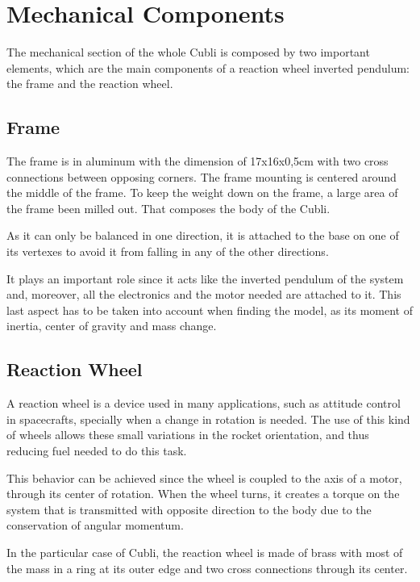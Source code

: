 \section{Mechanical Components}
The mechanical section of the whole Cubli is composed by two important elements, which are the main components of a reaction wheel inverted pendulum: the frame and the reaction wheel.



\subsection{Frame}



The frame is in aluminum with the dimension of 17x16x0,5cm  with two cross connections between opposing corners. The frame mounting is centered around the middle of the frame.
To keep the weight down on the frame, a large area of the frame been milled out. That composes the body of the Cubli. 

As it can only be balanced in one direction, it is attached to the base on one of its vertexes to avoid it from falling in any of the other directions.

It plays an important role since it acts like the inverted pendulum of the system and, moreover, all the electronics and the motor needed are attached to it. This last aspect has to be taken into account when finding the model, as its moment of inertia, center of gravity and mass change.

\subsection{Reaction Wheel}
A reaction wheel is a device used in many applications, such as attitude control in spacecrafts, specially when a change in rotation is needed. The use of this kind of wheels allows these small variations in the rocket orientation, and thus reducing fuel needed to do this task.

 This behavior can be achieved since the wheel is coupled to the axis of a motor, through its center of rotation. When the wheel turns, it creates a torque on the system that is transmitted with opposite direction to the body due to the conservation of angular momentum.

In the particular case of Cubli, the reaction wheel is made of brass with most of the mass in a ring at its outer edge and two cross connections through its center.
